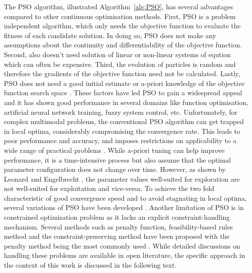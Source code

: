 	The PSO algorithm, illustrated Algorithm~\ref{alg:PSO}, has several advantages compared to other continuous optimisation methods. First, PSO is a problem independent algorithm, which only needs the objective function to evaluate the fitness of each candidate solution. In doing so, PSO does not make any assumptions about the continuity and differentiability of the objective function. Second, also doesn't need solution of linear or non-linear systems of eqution which can often be expensive. Third, the evolution of particles is random and therefore the gradients of the objective function need not be calculated. Lastly, PSO does not need a good initial estimate or a-priori knowledge of the objective function search space \cite{Freitas:2020aa}. These factors have led PSO to gain a widespread appeal and it has shown good performance in several domains like function optimisation, artificial neural network training, fuzzy system control, etc. Unfortunately, for complex multimodal problems, the conventional PSO algorithm can get trapped in local optima, considerably compromising the convergence rate. This leads to poor performance and accuracy, and imposes restrictions on applicability to a wide range of practical problems \cite{Xu:2013aa,Harrison:2018aa}. While a-priori tuning can help improve performance, it is a time-intensive process but also assume that the optimal parameter configuration does not change over time. However, as shown by Leonard and Engelbrecht \cite{Leonard:2013aa}, the parameter values well-suited for exploration are not well-suited for exploitation and vice-versa. To achieve the two fold characteristic of good convergence speed and to avoid stagnating in local optima, several variations of PSO have been developed \cite{Shi:1998aa,Ratnaweera:2004aa,Chatterjee:2006aa,Fan:2007aa,van-den-Bergh:2001aa}. Another limitation of PSO is in constrained optimisation problem as it lacks an explicit constraint-handling mechanism. Several methods such as penalty function, feasibility-based rules method and the constraint-preserving method have been proposed with the penalty method being the most commonly used \cite{Sun:2011aa,Jordehi:2015aa}. While detailed discussions on handling these problems are available in open literature, the specific approach in the context of this work is discussed in the following text. 	
	
